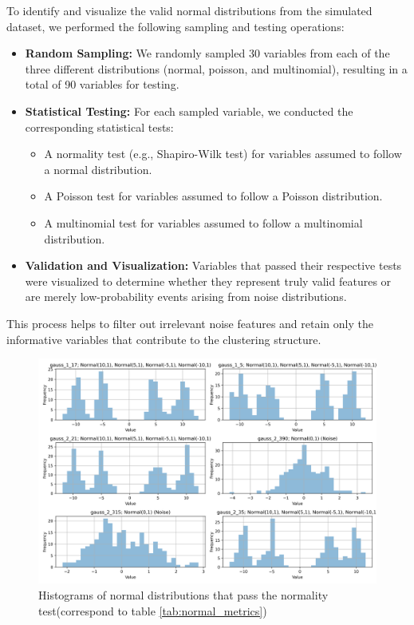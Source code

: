 To identify and visualize the valid normal distributions from the simulated dataset, we performed the following sampling and testing operations:

\begin{itemize}
    \item \textbf{Random Sampling:} We randomly sampled 30 variables from each of the three different distributions (normal, poisson, and multinomial), resulting in a total of 90 variables for testing.
    \item \textbf{Statistical Testing:} For each sampled variable, we conducted the corresponding statistical tests:
    \begin{itemize}
        \item A normality test (e.g., Shapiro-Wilk test) for variables assumed to follow a normal distribution.
        \item A Poisson test for variables assumed to follow a Poisson distribution.
        \item A multinomial test for variables assumed to follow a multinomial distribution.
    \end{itemize}
    \item \textbf{Validation and Visualization:} Variables that passed their respective tests were visualized to determine whether they represent truly valid features or are merely low-probability events arising from noise distributions.
\end{itemize}

This process helps to filter out irrelevant noise features and retain only the informative variables that contribute to the clustering structure.


\begin{figure}[!h]
    \centering
    \includegraphics[width=0.9\linewidth]{../results/sim_valid_normal_distributions.png}
    \caption{Histograms of normal distributions that pass the normality test(correspond to table \ref{tab:normal_metrics})}
    \label{fig:normal_histograms}
\end{figure}

